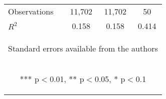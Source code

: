 \begin{center}
\begin{tabular}{lccc}
\midrule Observations & 11,702 & 11,702 & 50 \\
 $R^2$ & 0.158 & 0.158 & 0.414 \\ \bottomrule
\multicolumn{4}{c}{\begin{footnotesize} Standard errors available from the authors\end{footnotesize}} \\
\multicolumn{4}{c}{\begin{footnotesize} *** p$<$0.01, ** p$<$0.05, * p$<$0.1\end{footnotesize}} \\
\end{tabular}
\end{center}
